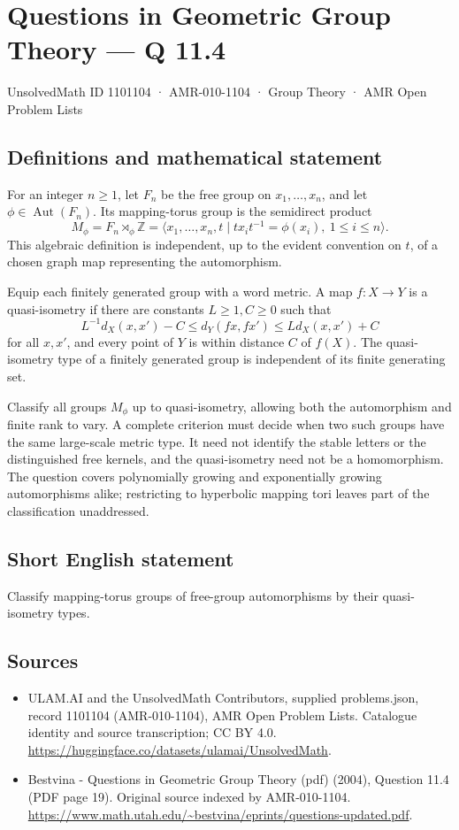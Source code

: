 \documentclass[11pt,a4paper]{article}
\begin{document}
\section*{Questions in Geometric Group Theory — Q 11.4}\label{1101104}
{\small UnsolvedMath ID 1101104 · AMR-010-1104 · Group Theory · AMR Open Problem Lists}
\subsection{Definitions and mathematical statement}
For an integer $n\geq1$, let $F_n$ be the free group on $x_1,\ldots,x_n$, and let $\phi\in\operatorname{Aut}(F_n)$. Its mapping-torus group is the semidirect product
\[
 M_\phi=F_n\rtimes_\phi\mathbb Z
 =\langle x_1,\ldots,x_n,t\mid
                   tx_it^{-1}=\phi(x_i),\ 1\leq i\leq n\rangle.
\]
This algebraic definition is independent, up to the evident convention on $t$, of a chosen graph map representing the automorphism.

Equip each finitely generated group with a word metric. A map $f:X\to Y$ is a quasi-isometry if there are constants $L\geq1,C\geq0$ such that
\[
 L^{-1}d_X(x,x')-C\leq d_Y(fx,fx')\leq Ld_X(x,x')+C
\]
for all $x,x'$, and every point of $Y$ is within distance $C$ of $f(X)$. The quasi-isometry type of a finitely generated group is independent of its finite generating set.

Classify all groups $M_\phi$ up to quasi-isometry, allowing both the automorphism and finite rank to vary. A complete criterion must decide when two such groups have the same large-scale metric type. It need not identify the stable letters or the distinguished free kernels, and the quasi-isometry need not be a homomorphism. The question covers polynomially growing and exponentially growing automorphisms alike; restricting to hyperbolic mapping tori leaves part of the classification unaddressed.
\subsection{Short English statement}
Classify mapping-torus groups of free-group automorphisms by their quasi-isometry types.
\subsection{Sources}
\begin{itemize}
\item[S1] ULAM.AI and the UnsolvedMath Contributors, supplied problems.json, record 1101104 (AMR-010-1104), AMR Open Problem Lists. Catalogue identity and source transcription; CC BY 4.0.
\url{https://huggingface.co/datasets/ulamai/UnsolvedMath}.
\item[S2] Bestvina - Questions in Geometric Group Theory (pdf) (2004), Question 11.4 (PDF page 19). Original source indexed by AMR-010-1104.
\url{https://www.math.utah.edu/~bestvina/eprints/questions-updated.pdf}.
\end{itemize}
\end{document}
